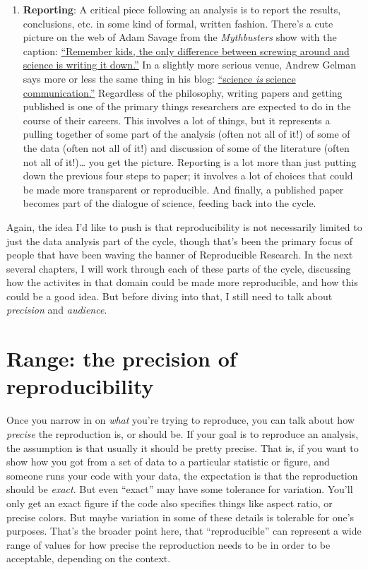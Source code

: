 \documentclass{book}
\begin{document}
\begin{enumerate}
\item \textbf{Reporting}: A critical piece following an analysis is to report the results, conclusions, etc. in some kind of formal, written fashion. There's a cute picture on the web of Adam Savage from the \emph{Mythbusters} show with the caption: \href{http://imgur.com/rnf2K}{``Remember kids, the only difference between screwing around and science is writing it down.''} In a slightly more serious venue, Andrew Gelman says more or less the same thing in his blog: \href{http://andrewgelman.com/2013/02/22/science-is-science-communication/}{``science \emph{is} science communication.''} Regardless of the philosophy, writing papers and getting published is one of the primary things researchers are expected to do in the course of their careers. This involves a lot of things, but it represents a pulling together of some part of the analysis (often not all of it!) of some of the data (often not all of it!) and discussion of some of the literature (often not all of it!)\ldots{} you get the picture. Reporting is a lot more than just putting down the previous four steps to paper; it involves a lot of choices that could be made more transparent or reproducible. And finally, a published paper becomes part of the dialogue of science, feeding back into the cycle.
\end{enumerate}

Again, the idea I'd like to push is that reproducibility is not necessarily limited to just the data analysis part of the cycle, though that's been the primary focus of people that have been waving the banner of Reproducible Research. In the next several chapters, I will work through each of these parts of the cycle, discussing how the activites in that domain could be made more reproducible, and how this could be a good idea. But before diving into that, I still need to talk about \emph{precision} and \emph{audience}.
\section{Range: the precision of reproducibility}
\label{sec-3-2}

Once you narrow in on \emph{what} you're trying to reproduce, you can talk about how \emph{precise} the reproduction is, or should be.  If your goal is to reproduce an analysis, the assumption is that usually it should be pretty precise. That is, if you want to show how you got from a set of data to a particular statistic or figure, and someone runs your code with your data, the expectation is that the reproduction should be \emph{exact}.  But even ``exact'' may have some tolerance for variation. You'll only get an exact figure if the code also specifies things like aspect ratio, or precise colors.  But maybe variation in some of these details is tolerable for one's purposes. That's the broader point here, that ``reproducible'' can represent a wide range of values for how precise the reproduction needs to be in order to be acceptable, depending on the context.
\end{document}

